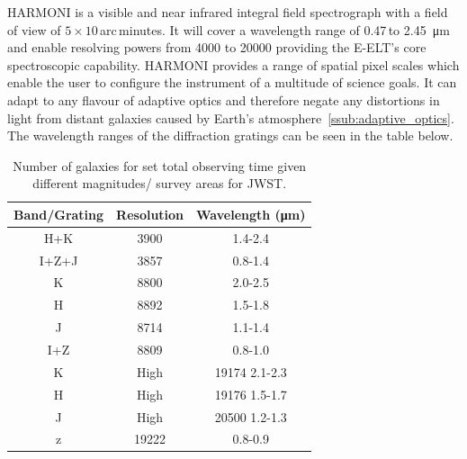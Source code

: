 			HARMONI is a visible and near infrared integral field spectrograph with a field of view of $5 \times 10$\,arc\,minutes. It will cover a wavelength range of 0.47\,to \SI{2.45}{\micro\metre} and enable resolving powers from \num{4000} to \num{20000} providing the E-ELT's core spectroscopic capability. HARMONI provides a range of spatial pixel scales which enable the user to configure the instrument of a multitude of science goals. It can adapt to any flavour of adaptive optics and therefore negate any distortions in light from distant galaxies caused by Earth's atmosphere~\ref{ssub:adaptive_optics}. The wavelength ranges of the diffraction gratings can be seen in the table below\cite{HARMONI}\cite{Hstats}.
			\begin{table}[htbp]
				\begin{center}
					\begin{tabular}{c|c|c}
						Band/Grating & Resolution & Wavelength (\si{\micro\metre}) \\
						\hline \hline
						H+K 	& 3900 	& 1.4-2.4 \\
						I+Z+J 	& 3857 	& 0.8-1.4 \\
						K 		& 8800 	& 2.0-2.5 \\
						H 		& 8892 	& 1.5-1.8 \\
						J 		& 8714 	& 1.1-1.4 \\
						I+Z 	& 8809 	& 0.8-1.0 \\
						K 		& High 	& 19174 2.1-2.3 \\
						H 		& High 	& 19176 1.5-1.7 \\
						J 		& High 	& 20500 1.2-1.3 \\
						z 		& 19222 & 0.8-0.9
					\end{tabular}
				\end{center}
				\caption{Number of galaxies for set total observing time given different magnitudes/ survey areas for JWST.\label{tab:galaxies_for_set_total_observing_time_JWST}}
			\end{table}
